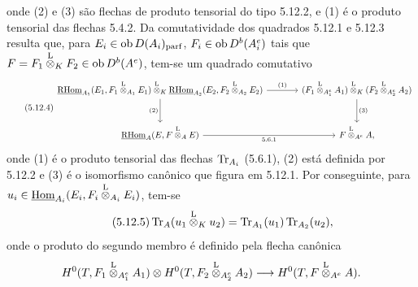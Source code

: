 onde (2) e (3) são flechas de produto tensorial do tipo 5.12.2, e (1) é o produto tensorial das flechas 5.4.2. Da comutatividade dos quadrados 5.12.1 e 5.12.3 resulta que, para $E_i\in\operatorname{ob} D(A_i)_{\mathrm{parf}}$, $F_i\in\operatorname{ob} D^b(A_i^e)$ tais que $F=F_1\overset{\mathrm L}{\otimes}_KF_2\in\operatorname{ob} D^b(A^e)$, tem-se um quadrado comutativo
\begin{equation}\tag{5.12.4}
\begin{tikzcd}[column sep=large,row sep=large]
\uRHom_{A_1}(E_1,F_1\lten_{A_1}E_1)\lten_K\uRHom_{A_2}(E_2,F_2\lten_{A_2}E_2) \arrow[r,"(1)"] \arrow[d,"(2)"'] & (F_1\lten_{A_1^e}A_1)\lten_K(F_2\lten_{A_2^e}A_2) \arrow[d,"(3)"]\\
\uRHom_A(E,F\lten_AE) \arrow[r,"5.6.1"'] & F\lten_{A^e}A,
\end{tikzcd}
\end{equation}
onde (1) é o produto tensorial das flechas $\operatorname{Tr}_{A_i}$ (5.6.1), (2) está definida por 5.12.2 e (3) é o isomorfismo canônico que figura em 5.12.1. Por conseguinte, para $u_i\in\underline{\operatorname{Hom}}_{A_i}(E_i,F_i\overset{\mathrm L}{\otimes}_{A_i}E_i)$, tem-se
\begin{equation}\tag{5.12.5}
\operatorname{Tr}_A(u_1\overset{\mathrm L}{\otimes}_Ku_2)=\operatorname{Tr}_{A_1}(u_1)\operatorname{Tr}_{A_2}(u_2),
\end{equation}
onde o produto do segundo membro é definido pela flecha canônica
\[
H^0(T,F_1\overset{\mathrm L}{\otimes}_{A_1^e}A_1)\otimes H^0(T,F_2\overset{\mathrm L}{\otimes}_{A_2^e}A_2)
\longrightarrow H^0(T,F\overset{\mathrm L}{\otimes}_{A^e}A).
\]
